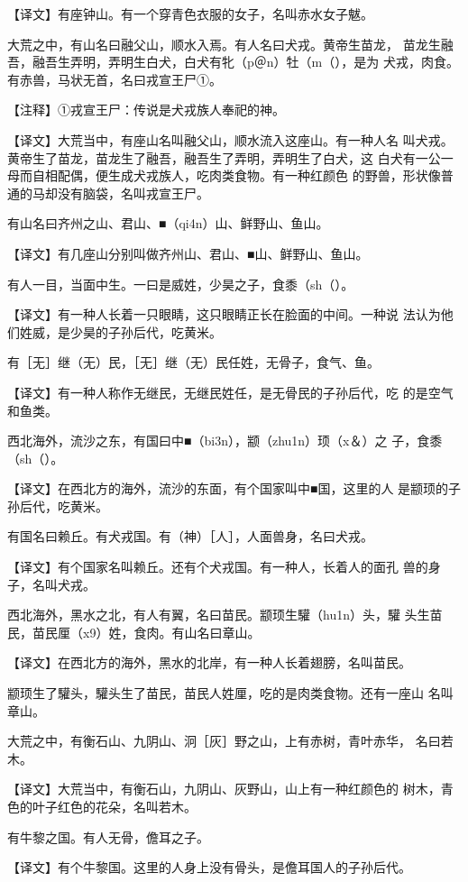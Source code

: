 \documentclass[a4paper,12pt,UTF8,twoside]{ctexbook}
\begin{document}
【译文】有座钟山。有一个穿青色衣服的女子，名叫赤水女子魃。

大荒之中，有山名曰融父山，顺水入焉。有人名曰犬戎。黄帝生苗龙， 苗龙生融吾，融吾生弄明，弄明生白犬，白犬有牝（p＠n）牡（m（），是为 犬戎，肉食。有赤兽，马状无首，名曰戎宣王尸①。

【注释】①戎宣王尸：传说是犬戎族人奉祀的神。

【译文】大荒当中，有座山名叫融父山，顺水流入这座山。有一种人名 叫犬戎。黄帝生了苗龙，苗龙生了融吾，融吾生了弄明，弄明生了白犬，这 白犬有一公一母而自相配偶，便生成犬戎族人，吃肉类食物。有一种红颜色 的野兽，形状像普通的马却没有脑袋，名叫戎宣王尸。

有山名曰齐州之山、君山、■（qi4n）山、鲜野山、鱼山。

【译文】有几座山分别叫做齐州山、君山、■山、鲜野山、鱼山。

有人一目，当面中生。一曰是威姓，少昊之子，食黍（sh（）。

【译文】有一种人长着一只眼睛，这只眼睛正长在脸面的中间。一种说 法认为他们姓威，是少昊的子孙后代，吃黄米。

有［无］继（无）民，［无］继（无）民任姓，无骨子，食气、鱼。

【译文】有一种人称作无继民，无继民姓任，是无骨民的子孙后代，吃 的是空气和鱼类。

西北海外，流沙之东，有国曰中■（bi3n），颛（zhu1n）顼（x＆）之 子，食黍（sh（）。

【译文】在西北方的海外，流沙的东面，有个国家叫中■国，这里的人 是颛顼的子孙后代，吃黄米。

有国名曰赖丘。有犬戎国。有（神）［人］，人面兽身，名曰犬戎。

【译文】有个国家名叫赖丘。还有个犬戎国。有一种人，长着人的面孔 兽的身子，名叫犬戎。

西北海外，黑水之北，有人有翼，名曰苗民。颛顼生驩（hu1n）头，驩 头生苗民，苗民厘（x9）姓，食肉。有山名曰章山。

【译文】在西北方的海外，黑水的北岸，有一种人长着翅膀，名叫苗民。

颛顼生了驩头，驩头生了苗民，苗民人姓厘，吃的是肉类食物。还有一座山 名叫章山。

大荒之中，有衡石山、九阴山、泂［灰］野之山，上有赤树，青叶赤华， 名曰若木。

【译文】大荒当中，有衡石山，九阴山、灰野山，山上有一种红颜色的 树木，青色的叶子红色的花朵，名叫若木。

有牛黎之国。有人无骨，儋耳之子。

【译文】有个牛黎国。这里的人身上没有骨头，是儋耳国人的子孙后代。
\end{document}
